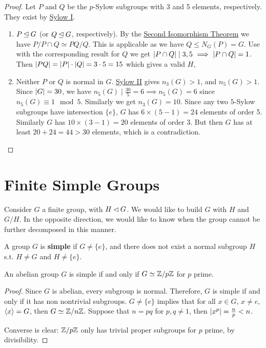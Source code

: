 \begin{proof}
    Let $P$ and $Q$ be the $p$-Sylow subgroups with 3 and 5 elements, respectively. They exist by \hyperref[thm: Sylow I]{Sylow I}.

    \begin{enumerate}
        \item[\bu{Case 1.}] $P \unlhd G$ (or $Q \unlhd G$, respectively). By the \hyperref[thm: second isomorphism theorem]{Second Isomorphism Theorem} we have $P/P \cap Q \simeq PQ/Q$. This is applicable as we have $Q \leq N_G(P) = G$. Use with the corresponding result for $Q$ we get $\left|P \cap Q\right| \mid 3, 5 \ \Longrightarrow\  \left|P \cap Q\right| = 1$. Then $\left|PQ\right| = \left|P\right| \cdot \left|Q\right| = 3 \cdot 5 = 15$ which gives a valid $H$,
        \item[\bu{Case 2.}] Neither $P$ or $Q$ is normal in $G$. \hyperref[thm: Sylow II]{Sylow II} gives $n_3(G) > 1$, and $n_5(G) > 1$. Since $\left|G\right| = 30$, we have $n_5(G) \mid \frac{30}{5} = 6 \implies n_5(G) = 6$ since $n_5(G) \equiv 1 \mod{5}$. Similarly we get $n_3(G) = 10$. Since any two $5$-Sylow subgroups have intersection $\{e\}$, $G$ has $6 \times (5-1) = 24$ elements of order 5. Similarly $G$ has $10 \times (3-1) = 20$ elements of order 3. But then $G$ has at least $20 + 24 = 44 > 30$ elements, which is a contradiction.
    \end{enumerate}
\end{proof}

\section{Finite Simple Groups}

\textstart
Consider $G$ a finite group, with $H \lhd G$. We would like to build $G$ with $H$ and $G/H$. In the opposite direction, we would like to know when the group cannot be further decomposed in this manner.

\begin{definition}[Simple]
    A group $G$ is \textbf{simple} if $G \neq \{e\}$, and there does not exist a normal subgroup $H$ s.t. $H \neq G$ and $H \neq \{e\}$.
\end{definition}

\begin{proposition}
    An abelian group $G$ is simple if and only if $G \simeq \mathbb{Z}/p\mathbb{Z}$ for $p$ prime.
\end{proposition}

\begin{proof}
    Since $G$ is abelian, every subgroup is normal. Therefore, $G$ is simple if and only if it has non nontrivial subgroups. $G \neq \{e\}$ implies that for all $x \in G$, $x \neq e$, $\left\langle x \right\rangle = G$, then $G \simeq \mathbb{Z}/n\mathbb{Z}$. Suppose that $n = pq$ for $p, q\neq 1$, then $\left|x^p\right| = \frac{n}{p} < n$.

    Converse is clear: $\mathbb{Z}/p\mathbb{Z}$ only has trivial proper subgroups for $p$ prime, by divisibility.
\end{proof}

